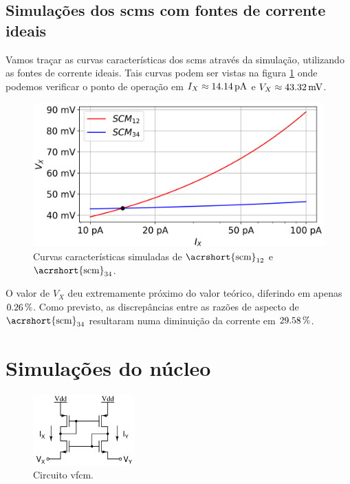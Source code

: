 \documentclass[10pt,a4paper]{extreport}
\newcommand{\?}{\stackrel{?}{=}}
\newcommand{\sis}[2]{\complexnum{#1}\,\si[per-mode=symbol]{#2}}
\newcommand{\mysize}{0.69}
\begin{document}
\subsection{Simulações dos \acrshort{scm}s com fontes de corrente ideais}

Vamos traçar as curvas características dos \acrshort{scm}s através da simulação, utilizando as fontes de corrente ideais. Tais curvas podem ser vistas na figura \ref{fig:scm_simulado} onde podemos verificar o ponto de operação em $I_X\approx\sis{14.14}{\pico\ampere}$ e $V_X\approx\sis{43.32}{\milli\volt}$.

\begin{figure}[htp!]
    \includegraphics[width=\mysize\linewidth]{Imagens/scm_simulado.png}
    \centering
    \caption{Curvas características simuladas de $\text{\acrshort{scm}}_{12}$ e $\text{\acrshort{scm}}_{34}$.}
    \label{fig:scm_simulado}
\end{figure}

O valor de $V_X$ deu extremamente próximo do valor teórico, diferindo em apenas $\sis{0.26}{\percent}$. Como previsto, as discrepâncias entre as razões de aspecto de $\text{\acrshort{scm}}_{34}$ resultaram numa diminuição da corrente em $\sis{29.58}{\percent}$.

\pagebreak

\section{Simulações do núcleo}

\begin{figure}
    \centering
    \vspace{-0.5cm}
    \includegraphics[width=0.35\textwidth]{Imagens/vfcm_simple_circuit.jpg}
    \caption{Circuito \acrshort{vfcm}.}
    \label{fig:vfcm_simple_circuit}
\end{figure}
\end{document}
